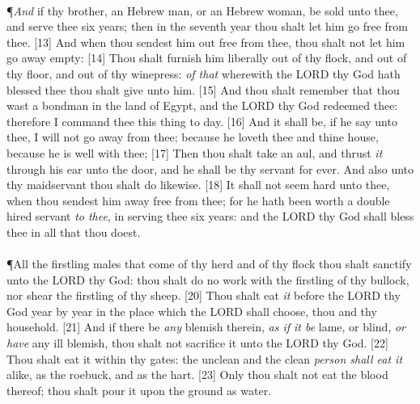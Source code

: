 \\
\P \textcolor[rgb]{0.00,0.00,1.00}{\emph{And} if thy brother, an Hebrew man, or an Hebrew woman, be sold unto thee, and serve thee six years; then in the seventh year thou shalt let him go free from thee.}
[13] \textcolor[rgb]{0.00,0.00,1.00}{And when thou sendest him out free from thee, thou shalt not let him go away empty:}
[14] \textcolor[rgb]{0.00,0.00,1.00}{Thou shalt furnish him liberally out of thy flock, and out of thy floor, and out of thy winepress: \emph{of that} wherewith the LORD thy God hath blessed thee thou shalt give unto him.}
[15] \textcolor[rgb]{0.00,0.00,1.00}{And thou shalt remember that thou wast a bondman in the land of Egypt, and the LORD thy God redeemed thee: therefore I command thee this thing to day.}
[16] \textcolor[rgb]{0.00,0.00,1.00}{And it shall be, if he say unto thee, I will not go away from thee; because he loveth thee and thine house, because he is well with thee;}
[17] \textcolor[rgb]{0.00,0.00,1.00}{Then thou shalt take an aul, and thrust \emph{it} through his ear unto the door, and he shall be thy servant for ever. And also unto thy maidservant thou shalt do likewise.}
[18] \textcolor[rgb]{0.00,0.00,1.00}{It shall not seem hard unto thee, when thou sendest him away free from thee; for he hath been worth a double hired servant \emph{to thee}, in serving thee six years: and the LORD thy God shall bless thee in all that thou doest.}\\
\\
\P \textcolor[rgb]{0.00,0.00,1.00}{All the firstling males that come of thy herd and of thy flock thou shalt sanctify unto the LORD thy God: thou shalt do no work with the firstling of thy bullock, nor shear the firstling of thy sheep.}
[20] \textcolor[rgb]{0.00,0.00,1.00}{Thou shalt eat \emph{it} before the LORD thy God year by year in the place which the LORD shall choose, thou and thy household.}
[21] \textcolor[rgb]{0.00,0.00,1.00}{And if there be \emph{any} blemish therein, \emph{as if it be} lame, or blind, \emph{or have} any ill blemish, thou shalt not sacrifice it unto the LORD thy God.}
[22] \textcolor[rgb]{0.00,0.00,1.00}{Thou shalt eat it within thy gates: the unclean and the clean \emph{person shall eat it} alike, as the roebuck, and as the hart.}
[23] \textcolor[rgb]{0.00,0.00,1.00}{Only thou shalt not eat the blood thereof; thou shalt pour it upon the ground as water.}
\newpage
